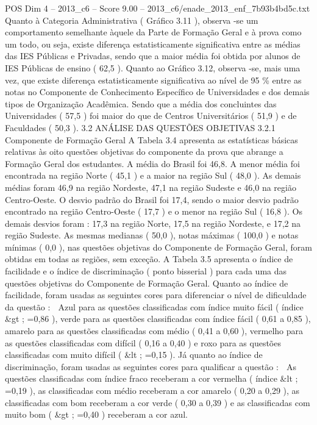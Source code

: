 \begin{textsample}{POS Dim 4 – 2013\_c6 – Score 9.00 – 2013\_c6/enade\_2013\_enf\_7b93b4bd5c.txt}
Quanto à Categoria Administrativa ( Gráfico 3.11 ), observa -se um comportamento semelhante àquele da Parte de Formação Geral e à prova como um todo, ou seja, existe diferença estatisticamente significativa entre as médias das IES Públicas e Privadas, sendo que a maior média foi obtida por alunos de IES Públicas de ensino ( 62,5 ).
Quanto ao Gráfico 3.12, observa -se, mais uma vez, que existe diferença estatisticamente significativa ao nível de 95 \% entre as notas no Componente de Conhecimento Específico de Universidades e dos demais tipos de Organização Acadêmica.
Sendo que a média dos concluintes das Universidades ( 57,5 ) foi maior do que de Centros Universitários ( 51,9 ) e de Faculdades ( 50,3 ). 3.2 ANÁLISE DAS QUESTÕES OBJETIVAS 3.2.1 Componente de Formação Geral A Tabela 3.4 apresenta as estatísticas básicas relativas às oito questões objetivas do componente da prova que abrange a Formação Geral dos estudantes.
A média do Brasil foi 46,8.
A menor média foi encontrada na região Norte ( 45,1 ) e a maior na região Sul ( 48,0 ).
As demais médias foram 46,9 na região Nordeste, 47,1 na região Sudeste e 46,0 na região Centro-Oeste.
O desvio padrão do Brasil foi 17,4, sendo o maior desvio padrão encontrado na região Centro-Oeste ( 17,7 ) e o menor na região Sul ( 16,8 ).
Os demais desvios foram : 17,3 na região Norte, 17,5 na região Nordeste, e 17,2 na região Sudeste.
As mesmas medianas ( 50,0 ), notas máximas ( 100,0 ) e notas mínimas ( 0,0 ), nas questões objetivas do Componente de Formação Geral, foram obtidas em todas as regiões, sem exceção.
A Tabela 3.5 apresenta o índice de facilidade e o índice de discriminação ( ponto bisserial ) para cada uma das questões objetivas do Componente de Formação Geral.
Quanto ao índice de facilidade, foram usadas as seguintes cores para diferenciar o nível de dificuldade da questão :  Azul para as questões classificadas com índice muito fácil ( índice \&gt ; =0,86 ), verde para as questões classificadas com índice fácil ( 0,61 a 0,85 ), amarelo para as questões classificadas com médio ( 0,41 a 0,60 ), vermelho para as questões classificadas com difícil ( 0,16 a 0,40 ) e roxo para as questões classificadas com muito difícil ( \&lt ; =0,15 ).
Já quanto ao índice de discriminação, foram usadas as seguintes cores para qualificar a questão :  As questões classificadas com índice fraco receberam a cor vermelha ( índice \&lt ; =0,19 ), as classificadas com médio receberam a cor amarelo ( 0,20 a 0,29 ), as classificadas com bom receberam a cor verde ( 0,30 a 0,39 ) e as classificadas com muito bom ( \&gt ; =0,40 ) receberam a cor azul.

\end{textsample}
